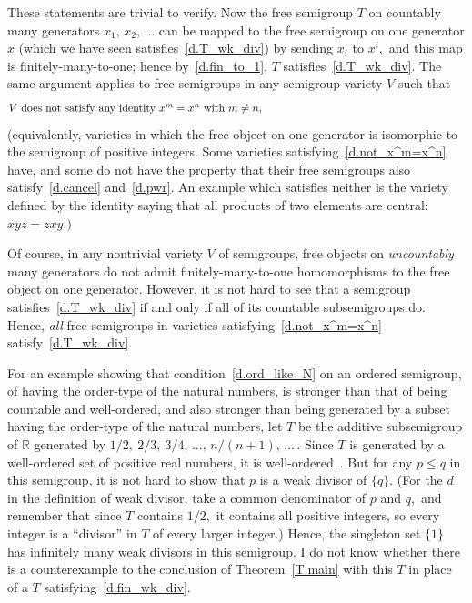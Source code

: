 \documentclass{amsart}
\numberwithin{equation}{section}
\numberwithin{theorem}{section}
\newcommand{\2}{\mathbf{2}}
\begin{document}
These statements are trivial to verify.
Now the free semigroup $T$ on countably
many generators $x_1,\,x_2,\,\dots$ can
be mapped to the free semigroup on one generator $x$ (which
we have seen satisfies~\eqref{d.T_wk_div}) by
sending $x_i$ to $x^i,$ and this map is
finitely-many-to-one; hence by~\eqref{d.fin_to_1},
$T$ satisfies~\eqref{d.T_wk_div}.
The same argument applies to
free semigroups in any semigroup variety $V$ such that
%
\begin{equation}\begin{minipage}[c]{35pc}\label{d.not_x^m=x^n}
$V$ does not satisfy any identity $x^m = x^n$ with $m\neq n,$
\end{minipage}\end{equation}
%
(equivalently, varieties in which the free object on
one generator is isomorphic to the semigroup of positive integers.
Some varieties satisfying~\eqref{d.not_x^m=x^n} have, and some
do not have the property that their free semigroups also
satisfy~\eqref{d.cancel} and~\eqref{d.pwr}.
An example which satisfies neither is the variety defined by
the identity saying that all products of two elements
are central: $xyz=zxy.)$

Of course, in any nontrivial variety $V$ of semigroups,
free objects on {\em uncountably} many generators do
not admit finitely-many-to-one homomorphisms to the
free object on one generator.
However, it is not hard to see that a semigroup
satisfies~\eqref{d.T_wk_div}
if and only if all of its countable subsemigroups do.
Hence, {\em all} free semigroups in varieties
satisfying~\eqref{d.not_x^m=x^n} satisfy~\eqref{d.T_wk_div}.

For an example showing that condition~\eqref{d.ord_like_N} on an
ordered semigroup, of having the order-type of the natural numbers,
is stronger than that of being countable and well-ordered,
and also stronger than being generated by a subset
having the order-type of the natural numbers,
let $T$ be the additive subsemigroup of $\mathbb{R}$ generated
by $1/2,\ 2/3,\ 3/4,\,\dots,\,n/(n{+}1),\,\dots\,.$
Since $T$ is generated by a well-ordered
set of positive real numbers, it is
well-ordered~\cite[Theorem~III.2.9, p.\,123]{UA}.
But for any $p\leq q$ in this semigroup, it is not hard to show
that $p$ is a weak divisor of $\{q\}.$
(For the $d$ in the definition of weak divisor,
take a common denominator of $p$ and $q,$ and
remember that since $T$ contains $1/2,$ it
contains all positive integers, so every integer is a
``divisor'' in $T$ of every larger integer.)
Hence, the singleton set $\{1\}$ has infinitely many weak divisors
in this semigroup.
I do not know whether there is a counterexample
to the conclusion of Theorem~\ref{T.main} with this $T$
in place of a $T$ satisfying~\eqref{d.fin_wk_div}.
\end{document}
